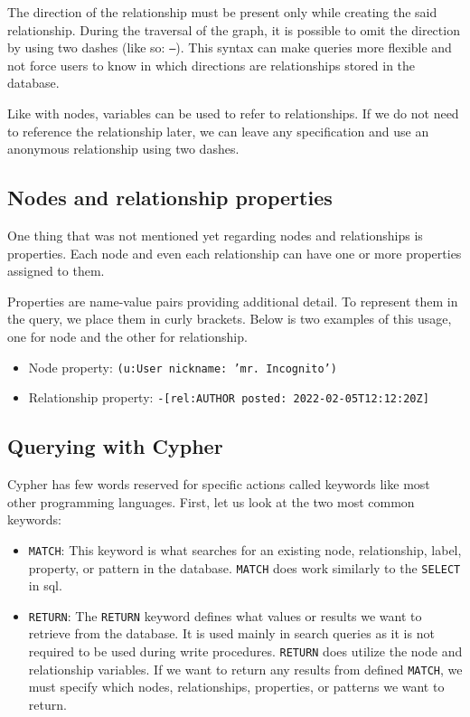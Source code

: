 The direction of the relationship must be present only while creating the said relationship.
During the traversal of the graph, it is possible to omit the direction by using two dashes (like so: \texttt{--}).
This syntax can make queries more flexible and not force users to know in which directions are relationships stored in the database.

Like with nodes, variables can be used to refer to relationships. If we do not need to reference the relationship later,
we can leave any specification and use an anonymous relationship using two dashes.

\subsection{Nodes and relationship properties}

One thing that was not mentioned yet regarding nodes and relationships is properties. Each node and even each relationship can have one or more properties assigned to them.

Properties are name-value pairs providing additional detail. To represent them in the query, we place them in curly brackets. \cite{noauthor_getting_nodate}
Below is two examples of this usage, one for node and the other for relationship.

\begin{itemize}
    \item {Node property: \texttt{(u:User {nickname: 'mr. Incognito'})}}
    \item {Relationship property: \texttt{-[rel:AUTHOR {posted: 2022-02-05T12:12:20Z}]}}
\end{itemize}

\subsection{Querying with Cypher}

Cypher has few words reserved for specific actions called keywords like most other programming languages. \cite{noauthor_querying_nodate} First, let us look at the two most common keywords:
\begin{itemize}
    \item {\texttt{MATCH}: This keyword is what searches for an existing node, relationship, label, property, or pattern in the database. \texttt{MATCH} does work similarly to the \texttt{SELECT} in \acrshort{sql}.}
    \item {\texttt{RETURN}: The \texttt{RETURN} keyword defines what values or results we want to retrieve from the database.
          It is used mainly in search queries as it is not required to be used during write procedures.
          \texttt{RETURN} does utilize the node and relationship variables. If we want to return any results from defined \texttt{MATCH},
          we must specify which nodes, relationships, properties, or patterns we want to return.}
\end{itemize}

